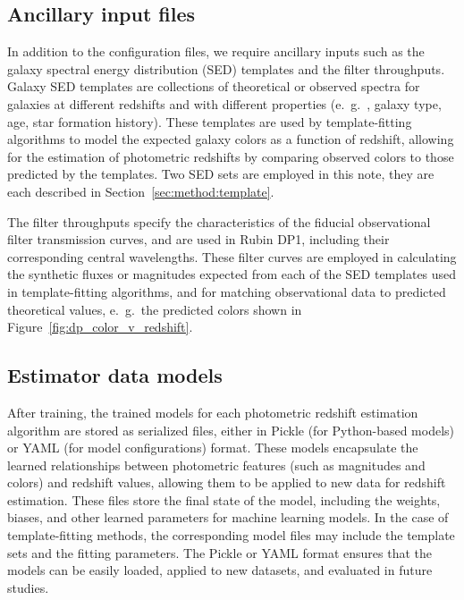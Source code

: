 \subsection{Ancillary input files}
\label{sec:products:algo_files}

In addition to the configuration files, we require ancillary inputs such as the galaxy spectral energy distribution (SED) templates and the filter throughputs.  Galaxy SED templates are collections of theoretical or observed spectra for galaxies at different redshifts and with different properties (e.~g.~, galaxy type, age, star formation history).  These templates are used by template-fitting algorithms to model the expected galaxy colors as a function of redshift, allowing for the estimation of photometric redshifts by comparing observed colors to those predicted by the templates.  Two SED sets are employed in this note, they are each described in Section~\ref{sec:method:template}.

The filter throughputs specify the characteristics of the fiducial observational filter transmission curves, and are used in Rubin DP1, including their corresponding central wavelengths.  These filter curves are employed in calculating the synthetic fluxes or magnitudes expected from each of the SED templates used in template-fitting algorithms, and for matching observational data to predicted theoretical values, e.~g.~the predicted colors shown in Figure~\ref{fig:dp_color_v_redshift}.


\subsection{Estimator data models}
\label{sec:products:models}

After training, the trained models for each photometric redshift estimation algorithm are stored as serialized files, either in Pickle (for Python-based models) or YAML (for model configurations) format.  These models encapsulate the learned relationships between photometric features (such as magnitudes and colors) and redshift values, allowing them to be applied to new data for redshift estimation.  These files store the final state of the model, including the weights, biases, and other learned parameters for machine learning models.  In the case of template-fitting methods, the corresponding model files may include the template sets and the fitting parameters.  The Pickle or YAML format ensures that the models can be easily loaded, applied to new datasets, and evaluated in future studies.



